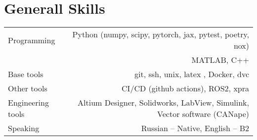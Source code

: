 \section*{Generall Skills}
\begin{tabular}{@{}L!{\VRule}R}
    Programming    & Python (numpy, scipy, pytorch, jax, pytest, poetry, nox) \\
    & MATLAB, C++                    \\
    Base tools & git, ssh, unix, latex , Docker, dvc \\
    Other tools &  CI/CD (github actions), ROS2, xpra \\
    Engineering tools &  Altium Designer, Solidworks, LabView, Simulink, Vector software (CANape) \\
    Speaking      & Russian -- Native, English -- B2                      \\
\end{tabular}
